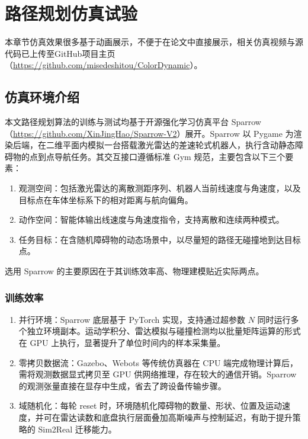 \documentclass[
  oneside,
  degree=bachelor,
  fullwidthstop=false,
  fontset=fandol,
  times=false,
  minted=true,
  biblatex=true,
]{tongjithesis}
\begin{document}
\chapter{路径规划仿真试验}\label{chap:path_planning_simulation}
本章节仿真效果很多基于动画展示，不便于在论文中直接展示，相关仿真视频与源代码已上传至GitHub项目主页（\url{https://github.com/misedeshitou/ColorDynamic}）。

\section{仿真环境介绍}
本文路径规划算法的训练与测试均基于开源强化学习仿真平台 Sparrow（\url{https://github.com/XinJingHao/Sparrow-V2}）展开。Sparrow 以 Pygame 为渲染后端，在二维平面内模拟一台搭载激光雷达的差速轮式机器人，执行含动静态障碍物的点到点导航任务。其交互接口遵循标准 Gym 规范，主要包含以下三个要素：

\begin{enumerate}
    \item 观测空间：包括激光雷达的离散测距序列、机器人当前线速度与角速度，以及目标点在车体坐标系下的相对距离与航向偏角。
    \item 动作空间：智能体输出线速度与角速度指令，支持离散和连续两种模式。
    \item 任务目标：在含随机障碍物的动态场景中，以尽量短的路径无碰撞地到达目标点。
\end{enumerate}

选用 Sparrow 的主要原因在于其训练效率高、物理建模贴近实际两点。

\subsection{训练效率}

\begin{enumerate}
\item 并行环境：Sparrow 底层基于 PyTorch 实现，支持通过超参数 $N$ 同时运行多个独立环境副本。运动学积分、雷达模拟与碰撞检测均以批量矩阵运算的形式在 GPU 上执行，显著提升了单位时间内的样本采集量。
\item 零拷贝数据流：Gazebo、Webots 等传统仿真器在 CPU 端完成物理计算后，需将观测数据显式拷贝至 GPU 供网络推理，存在较大的通信开销。Sparrow 的观测张量直接在显存中生成，省去了跨设备传输步骤。
\item 域随机化：每轮 reset 时，环境随机化障碍物的数量、形状、位置及运动速度，并可在雷达读数和底盘执行层面叠加高斯噪声与控制延迟，有助于提升策略的 Sim2Real 迁移能力。
\end{enumerate}
\end{document}
